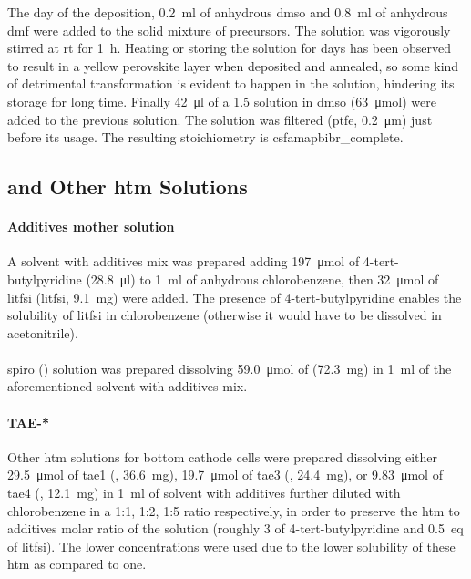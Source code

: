 The day of the deposition, \SI{0.2}{\ml} of anhydrous \gls{dmso} and \SI{0.8}{\ml} of anhydrous \gls{dmf} were added to the solid mixture of precursors. The solution was vigorously stirred at \gls{rt} for \SI{1}{\hour}. Heating or storing the solution for days has been observed to result in a yellow perovskite layer when deposited and annealed, so some kind of detrimental transformation is evident to happen in the solution, hindering its storage for long time. Finally \SI{42}{\ul} of
a \SI{1.5}{\Molar} \CsI solution in \gls{dmso} (\SI{63}{\umol}) were added to the previous solution. The solution was filtered (\gls{ptfe}, \SI{0.2}{\um}) just before its usage. The resulting stoichiometry is \acrshort{csfamapbibr_complete}.

\subsection{\Spiro and Other \gls{htm} Solutions}

\paragraph{Additives mother solution} A solvent with additives mix was prepared adding \SI{197}{\umol} of 4-tert-butylpyridine (\SI{28.8}{\ul}) to \SI{1}{\ml} of anhydrous chlorobenzene, then \SI{32}{\umol} of \glsdesc{litfsi} (\gls{litfsi}, \SI{9.1}{\mg}) were added. The presence of 4-tert-butylpyridine enables the solubility of \gls{litfsi} in chlorobenzene (otherwise it would have to be dissolved in acetonitrile).

\paragraph{\Spiro} \Glsdesc{spiro} (\spiro) solution was prepared dissolving \SI{59.0}{\umol} of \spiro (\SI{72.3}{\mg}) in \SI{1}{\ml} of the aforementioned solvent with additives mix.

\paragraph{TAE-*} Other \gls{htm} solutions for bottom cathode cells were prepared dissolving either \SI{29.5}{\umol} of \glsdesc{tae1} (, \SI{36.6}{\mg}), \SI{19.7}{\umol} of \glsdesc{tae3} (, \SI{24.4}{\mg}), or \SI{9.83}{\umol} of \glsdesc{tae4} (, \SI{12.1}{\mg}) in \SI{1}{\ml} of solvent with additives further diluted with chlorobenzene in a 1:1, 1:2, 1:5 ratio respectively, in order to preserve the \gls{htm} to additives molar ratio of the \spiro solution (roughly \SI{3}{\eq} of 4-tert-butylpyridine and \SI{0.5}{eq} of \gls{litfsi}). The lower concentrations were used due to the lower solubility of these \gls{htm} as compared to \spiro one.

